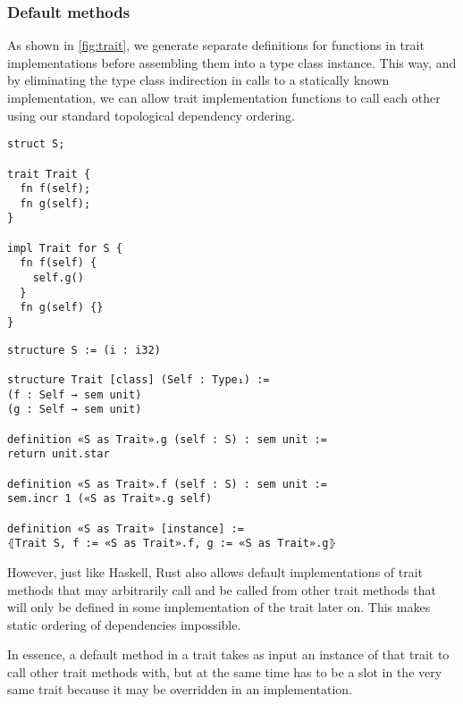 \subsubsection{Default methods}

As shown in \autoref{fig:trait}, we generate separate definitions for functions in trait
implementations before assembling them into a type class instance. This way, and
by eliminating the type class indirection in calls to a statically known
implementation, we can allow trait implementation functions to call each other
using our standard topological dependency ordering.

\vspace{1em}\noindent\begin{minipage}{0.36\textwidth}
  \begin{verbatim}
struct S;

trait Trait {
  fn f(self);
  fn g(self);
}

impl Trait for S {
  fn f(self) {
    self.g()
  }
  fn g(self) {}
}
  \end{verbatim}
\end{minipage}
\begin{minipage}{0.64\textwidth}
  \begin{verbatim}
structure S := (i : i32)

structure Trait [class] (Self : Type₁) :=
(f : Self → sem unit)
(g : Self → sem unit)

definition «S as Trait».g (self : S) : sem unit :=
return unit.star

definition «S as Trait».f (self : S) : sem unit :=
sem.incr 1 («S as Trait».g self)

definition «S as Trait» [instance] :=
⦃Trait S, f := «S as Trait».f, g := «S as Trait».g⦄
  \end{verbatim}
\end{minipage}\vspace{1em}

However, just like Haskell, Rust also allows default implementations of trait
methods that may arbitrarily call and be called from other trait methods that
will only be defined in some implementation of the trait later on. This
makes static ordering of dependencies impossible.

In essence, a default method in a trait takes as input an instance of that trait
to call other trait methods with, but at the same time has to be a slot in the
very same trait because it may be overridden in an implementation.

